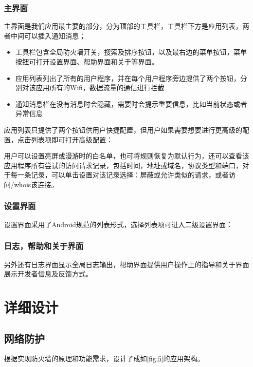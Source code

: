 \documentclass[format=final, language=chinese, degree=fyp]{hustthesis}
\begin{document}
\subsection{主界面}

主界面是我们应用最主要的部分，分为顶部的工具栏，工具栏下方是应用列表，两者中间可以插入通知消息；
\begin{itemize}
    \item 工具栏包含全局防火墙开关，搜索及排序按钮，以及最右边的菜单按钮，菜单按钮可打开设置界面、帮助界面和关于等界面。
    \item 应用列表列出了所有的用户程序，并在每个用户程序旁边提供了两个按钮，分别对该应用所有的Wifi，数据流量的通信进行拦截
    \item 通知消息栏在没有消息时会隐藏，需要时会提示重要信息，比如当前状态或者异常信息
\end{itemize}

应用列表只提供了两个按钮供用户快捷配置，但用户如果需要想要进行更高级的配置，点击列表项即可打开高级配置：


用户可以设置亮屏或漫游时的白名单，也可将规则恢复为默认行为，还可以查看该应用程序所有尝试的访问请求记录，包括时间，地址或域名，协议类型和端口，对于每一条记录，可以单击设置对该记录选择：屏蔽或允许类似的请求，或者访问/whois该连接。

\subsection{设置界面}

设置界面采用了Android规范的列表形式，选择列表项可进入二级设置界面：

\subsection{日志，帮助和关于界面}

另外还有日志界面显示全局日志输出，帮助界面提供用户操作上的指导和关于界面展示开发者信息及反馈方式。

\chapter{详细设计}

\section{网络防护}



根据实现防火墙的原理和功能需求，设计了成如\autoref{fig:5}的应用架构。
\end{document}
